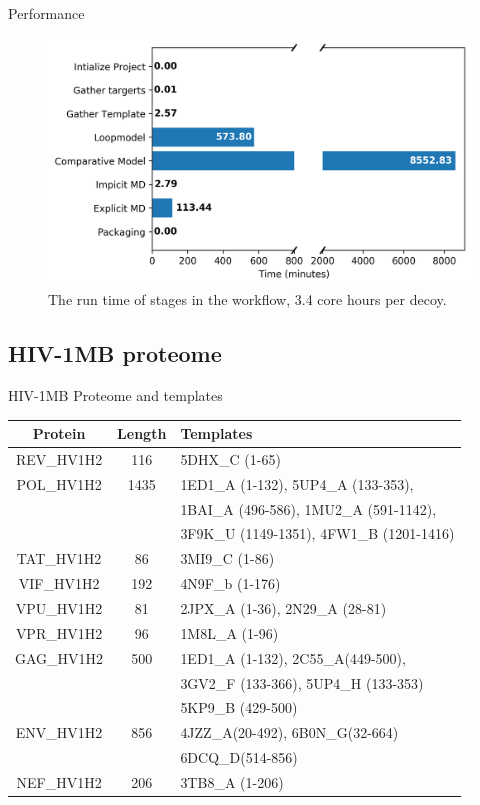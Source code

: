 \documentclass{beamer}
\begin{document}
\begin{frame}{Performance}
\begin{figure}
\includegraphics[width=\linewidth]{./Figures/Result_run_time.png} 
\caption{The run time of stages in the workflow, 3.4 core hours per decoy. }
\end{figure}

\end{frame}

\subsection{HIV-1MB proteome} 

\begin{frame}{HIV-1MB Proteome and templates}
\begin{table}[!ht] 
	\centering 
	\begin{tabular}{ccl}
		Protein & Length & Templates\\ \hline 
		REV\_HV1H2 & 116 & 5DHX\_C (1-65) \\
		POL\_HV1H2 & 1435 & 1ED1\_A (1-132), 5UP4\_A (133-353),  \\
		&& 1BAI\_A (496-586), 1MU2\_A (591-1142),  \\
		&& 3F9K\_U (1149-1351), 4FW1\_B (1201-1416) \\
		TAT\_HV1H2 & 86 & 3MI9\_C (1-86) \\
		VIF\_HV1H2 & 192 & 4N9F\_b (1-176) \\
		VPU\_HV1H2 & 81 & 2JPX\_A (1-36), 2N29\_A (28-81)\\
		VPR\_HV1H2 & 96 & 1M8L\_A (1-96)\\
		GAG\_HV1H2 & 500 & 1ED1\_A (1-132), 2C55\_A(449-500), \\
		&& 3GV2\_F (133-366), 5UP4\_H (133-353)\\ 
		&& {\color{red} 5KP9\_B (429-500)}\\
		ENV\_HV1H2 & 856 & 4JZZ\_A(20-492), 6B0N\_G(32-664)\\
		&&{\color{red} 6DCQ\_D(514-856)}\\
		NEF\_HV1H2 & 206 & 3TB8\_A (1-206)\\
	\end{tabular}  
	\label{HIV-prot}  
\end{table}
\end{frame}
\end{document}
